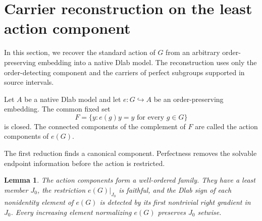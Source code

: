 \documentclass[11pt]{amsart}
\newtheorem{lemma}[theorem]{Lemma}
\theoremstyle{definition}
\theoremstyle{remark}
\numberwithin{equation}{section}
\begin{document}
\section{Carrier reconstruction on the least action component}
\label{sec:spatiality}

In this section, we recover the standard action of \(G\) from an arbitrary order-preserving embedding into a native Dlab model. The reconstruction uses only the order-detecting component and the carriers of perfect subgroups supported in source intervals.

Let \(A\) be a native Dlab model and let \(e:G\hookrightarrow A\) be an order-preserving embedding. The common fixed set
\[
F=\{y:e(g)y=y\text{ for every }g\in G\}
\]
is closed. The connected components of the complement of \(F\) are called the action components of \(e(G)\).

The first reduction finds a canonical component. Perfectness removes the solvable endpoint information before the action is restricted.

\begin{lemma}
\label{lem:least-component}
The action components form a well-ordered family. They have a least member \(J_0\), the restriction \(e(G)|_{J_0}\) is faithful, and the Dlab sign of each nonidentity element of \(e(G)\) is detected by its first nontrivial right gradient in \(J_0\). Every increasing element normalizing \(e(G)\) preserves \(J_0\) setwise.
\end{lemma}
\end{document}
